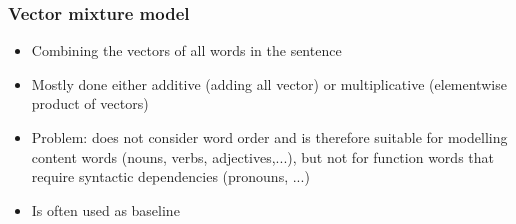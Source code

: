 \subsubsection{Vector mixture model}
\begin{itemize}
	\item Combining the vectors of all words in the sentence
	\item Mostly done either additive (adding all vector) or multiplicative (elementwise product of vectors)
	\item Problem: does not consider word order and is therefore suitable for modelling content words (nouns, verbs, adjectives,...), but not for function words that require syntactic dependencies (pronouns, ...)
	\item Is often used as baseline
\end{itemize}
